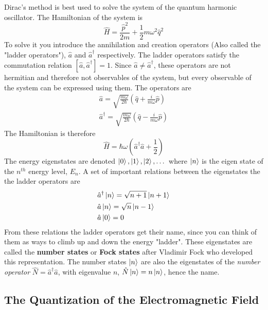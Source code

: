Dirac's method is best used to solve the system of the quantum harmonic oscillator. The Hamiltonian of the system is
\[
    \hat{H} = \frac{\hat{p}^2}{2m} + \frac{1}{2}m\omega^2 \hat{q}^2
\]
To solve it you introduce the annihilation and creation operators (Also called the "ladder operators"), $\hat{a}$ and $\hat{a}^\dag$ respectively. The ladder operators satisfy the commutation relation $[\hat{a}, \hat{a}^\dag] = 1$. Since $\hat{a} \ne \hat{a}^\dag$, these operators are not hermitian and therefore not observables of the system, but every observable of the system can be expressed using them. The operators are
\begin{align*}
    \hat{a} = \sqrt{\frac{m \omega}{2\hbar}} (\hat{q} + \frac{i}{m\omega}\hat{p}) \\
    \hat{a}^\dag = \sqrt{\frac{m \omega}{2\hbar}} (\hat{q} - \frac{i}{m\omega}\hat{p})
\end{align*}
The Hamiltonian is therefore
\[
    \hat{H} = \hbar \omega (\hat{a}^\dag\hat{a} + \frac{1}{2})
\]
The energy eigenstates are denoted $\ket{0}, \ket{1}, \ket{2}, \dots$ where $\ket{n}$ is the eigen state of the $n^{th}$ energy level, $E_n$. A set of  important relations between the eigenstates the the ladder operators are
\begin{align*}
    &\hat{a}^\dag \ket{n} = \sqrt{n+1}\ket{n+1} \\
    &\hat{a} \ket{n} = \sqrt{n}\ket{n-1} \\
    &\hat{a} \ket{0} = 0
\end{align*}
From these relations the ladder operators get their name, since you can think of them as ways to climb up and down the energy "ladder". These eigenstates are called the \textbf{number states} or \textbf{Fock states} after Vladimir Fock who developed this representation. The number states $\ket{n}$ are also the eigenstates of the \textit{number operator} $\hat{N} = \hat{a}^\dag\hat{a}$, with eigenvalue $n$, $\hat{N}\ket{n} =  n\ket{n}$, hence the name.

\subsection{The Quantization of the Electromagnetic Field}

